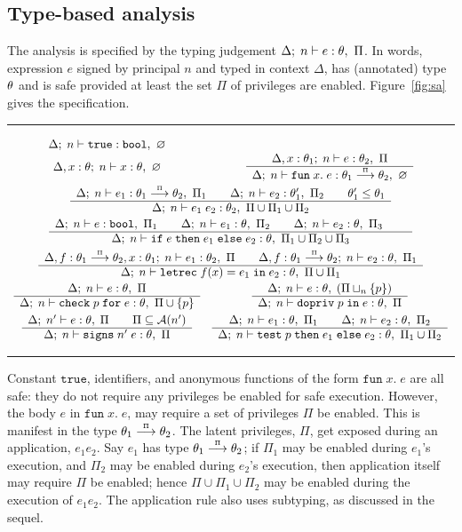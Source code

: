 \documentclass[submission,copyright,creativecommons]{eptcs}
\newcommand{\Rule}[2]{          \begin{array}{c}
  #1 \\\hline
  #2
  \end{array}}
\newcommand{\ifthenelse}[3]{\IF\;#1\;\THEN\;#2\;\ELSE\;#3}
\newcommand{\enable}[2]{\ENABLE\;#1\;\IN\;#2}
\newcommand{\chk}[2]{\CHK\;#1\;\FOR\;#2}
\newcommand{\test}[3]{\TEST\;#1\;\THEN\;#2\;\ELSE\;#3}
\newcommand{\signs}[2]{\SIGNS\;#1\;#2}
\newcommand{\BOOL}{\mbox{\texttt{bool}}}
\newcommand{\ELSE}{\mbox{\texttt{else}}}
\newcommand{\IF}{\mbox{\texttt{if}}}
\newcommand{\FOR}{\mbox{\texttt{for}}}
\newcommand{\IN}{\mbox{\texttt{in}}}
\newcommand{\LET}{\mbox{\texttt{let}}}
\newcommand{\REC}{{\texttt{rec}}}
\newcommand{\THEN}{{\texttt{then}}}
\newcommand{\TRUE}{{\texttt{true}}}
\newcommand{\A}{\mathcal{A}}
\newcommand{\union}{\cup}
\newcommand{\proves}{\vdash}
\newcommand{\Empty}{\varnothing}
\def\lpields#1{\stackrel{#1}{\longrightarrow}}
\newcommand{\annoto}[1]{\lpields {\scriptscriptstyle #1}}
\newcommand{\recdecl}[3]{\REC\;#1(#2) = #3}
\newcommand{\ENABLE}{\mbox{\texttt{dopriv}}}
\newcommand{\CHK}{\mbox{\texttt{check}}}
\newcommand{\TEST}{\mbox{\texttt{test}}}
\newcommand{\SIGNS}{\mbox{\texttt{signs}}}
\newcommand{\letdecl}[2]{\LET#1\;\IN\;#2}
\newcommand{\LAM}[2]{{\mathtt{fun}\; #1.\; #2}}
\newcommand{\n}{n} \newcommand{\p}{p} \newcommand{\Ps}{\Pi} \newcommand{\h}{h}
\begin{document}
\subsection{Type-based analysis}
The analysis is specified by the typing judgement $\Delta;\;\n\proves
e:\th,~\Pi$.  In words, expression $e$ signed by principal $\n$ and
typed in context $\Delta$, has (annotated) type $\theta$ and is safe
provided at least the set $\Ps$ of privileges are
enabled. Figure~\ref{fig:sa} gives the specification.
\begin{figure*}
\hrule
\medskip
\[
\begin{array}{cc}
\Delta;\;\n\proves \TRUE:\BOOL, ~\Empty &
\\
\Delta,x:\th;\;\n \proves x:\th, ~\Empty &
\Rule{\Delta,x:\th_1;\;\n\proves e:\th_2, ~\Ps}
     {\Delta;\;\n\proves\LAM{x}{e}:\th_1\annoto{\Ps}\th_2, ~\Empty} 
\\[2ex]
\multicolumn{2}{c}{
\Rule{\Delta;\;\n\proves e_1: \th_1\annoto{\Ps}\th_2, ~\Ps_1 \qquad 
      \Delta;\;\n\proves e_2: \th'_1, ~\Ps_2 \qquad \th'_1\leq\th_1}
     {\Delta;\;\n\proves e_1\;e_2: \th_2, ~\Ps\union\Ps_1\union\Ps_2}
}
\\[2ex]
\multicolumn{2}{c}{
\Rule{\Delta;\;\n\proves e:\BOOL, ~\Ps_1 \qquad
      \Delta;\;\n\proves e_1:\th, ~\Ps_2 \qquad 
      \Delta;\;\n\proves e_2:\th, ~\Ps_3 \qquad}
     {\Delta;\;\n\proves \ifthenelse{e}{e_1}{e_2}:\th, 
      ~\Ps_1\union\Ps_2\union\Ps_3}
}
\\[2ex]
\multicolumn{2}{c}{
\Rule{\Delta, f:\th_1\annoto{\Ps}\th_2, x:\th_1;\;\n
      \proves e_1:\th_2, ~\Ps
      \qquad
      \Delta, f:\th_1\annoto{\Ps}\th_2;\;\n\proves e_2:\th, ~\Ps_1}
     {\Delta;\;\n\proves\letdecl{\recdecl{f}{x}{e_1}}{e_2}: \th, 
      ~\Ps\union\Ps_1}
}
\\[2ex]
\Rule{\Delta;\;\n\proves e:\th, ~\Ps}
     {\Delta;\;\n\proves \chk{\p}{e}:\th,~\Ps\union\{\p\}} &
\Rule{\Delta;\;\n\proves e:\th, \; (\Ps\sqcup_{\n}\{\p\}) }
     {\Delta;\;\n\proves \enable{\p}{e}:\th,~\Ps}
\\[2ex]
\Rule{\Delta;\;\n'\proves e:\th, \;\Ps \qquad \Ps\subseteq\A(\n') }
     {\Delta;\;\n\proves \signs{\n'}{e}:\th,~\Ps} &
\Rule{\Delta;\;\n\proves e_1:\th, ~\Ps_1\qquad
      \Delta;\;\n\proves e_2:\th, ~\Ps_2}
     {\Delta;\;\n\proves \test{\p}{e_1}{e_2}:\th,~\Ps_1\union\Ps_2}
\end{array}
\]
\medskip
\hrule
\medskip
\caption{Static analysis}
\label{fig:sa}
\end{figure*}

Constant $\TRUE$, identifiers, and anonymous functions
of the form $\LAM{x}{e}$ are all safe: they do not require any
privileges be enabled for safe execution. However, the body $e$ in
$\LAM{x}{e}$, may require a set of privileges $\Ps$ be enabled. This
is manifest in the type $\th_1\annoto{\Ps}\th_2$.
The latent privileges, $\Ps$, get exposed during an application, $e_1
e_2$. Say $e_1$ has type $\th_1\annoto{\Ps}\th_2$; if $\Ps_1$ may be
enabled during $e_1$'s execution, and $\Ps_2$ may be enabled during
$e_2$'s execution, then application itself may require $\Ps$ be
enabled; hence $\Ps\union\Ps_1\union\Ps_2$ may be enabled during the
execution of $e_1e_2$.  The application rule also uses subtyping, as discussed in the
sequel.  
\end{document}
